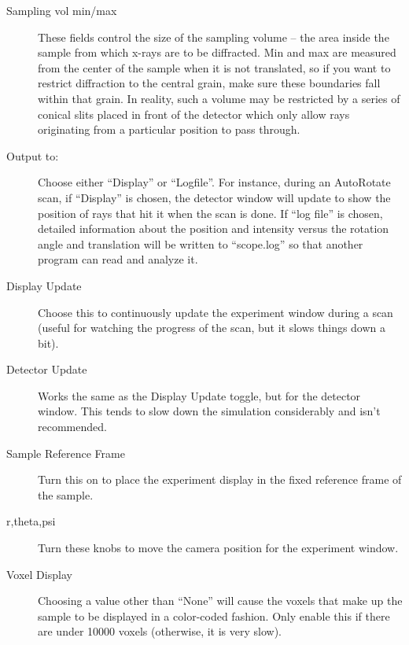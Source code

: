 \documentclass{article}
\begin{document}
\begin{description}
		\item[Sampling vol min/max] These fields control the size of
		the sampling volume -- the area inside the sample from which
		x-rays are to be diffracted.  Min and max are measured from the
		center of the sample when it is not translated, so if you want
		to restrict diffraction to the central grain, make sure these
		boundaries fall within that grain. In reality, such a volume
		may be restricted by a series of conical slits placed in
		front of the detector which only allow rays originating from a
		particular position to pass through.
		

		\item[Output to:] Choose either ``Display'' or ``Logfile''.
		For instance, during an AutoRotate scan, if ``Display'' is
		chosen, the detector window will update to show the position
		of rays that hit it when the scan is done. If ``log file'' is
		chosen, detailed information about the position and intensity
		versus the rotation angle and translation will be written to
		``scope.log'' so that another program can read and analyze it.

	\end{description}

\bigskip

	\begin{description}

		\item[Display Update] Choose this to continuously update the
		experiment window during a scan (useful for watching the
		progress of the scan, but it slows things down a bit). 

		\item[Detector Update] Works the same as the Display Update
		toggle, but for the detector window.  This tends to slow down
		the simulation considerably and isn't recommended.

		\item[Sample Reference Frame] Turn this on to place the
		experiment display in the fixed reference frame of the sample.

		\item[r,theta,psi] Turn these knobs to move the camera
		position for the experiment window.

		\item[Voxel Display] Choosing a value other than ``None'' will
		cause the voxels that make up the sample to be displayed in a
		color-coded fashion.  Only enable this if there are under
		10000 voxels (otherwise, it is very slow).

	\end{description}
\end{document}
